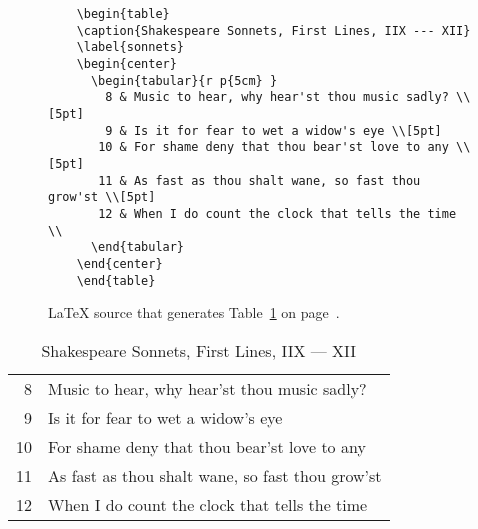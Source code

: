 \begin{figure}
\begin{verbatim}
    \begin{table}
    \caption{Shakespeare Sonnets, First Lines, IIX --- XII}
    \label{sonnets}
    \begin{center}
      \begin{tabular}{r p{5cm} }
        8 & Music to hear, why hear'st thou music sadly? \\[5pt]
        9 & Is it for fear to wet a widow's eye \\[5pt]
       10 & For shame deny that thou bear'st love to any \\[5pt]  
       11 & As fast as thou shalt wane, so fast thou grow'st \\[5pt]
       12 & When I do count the clock that tells the time \\
      \end{tabular}
    \end{center}
    \end{table}
\end{verbatim}
\caption{\LaTeX{} source that generates Table~\ref{sonnets} on 
page~\pageref{sonnets}.}
\label{sonnet-text}
\end{figure}

\begin{table}
\caption{Shakespeare Sonnets, First Lines, IIX --- XII}
\label{sonnets}
\begin{center}
\begin{tabular}{r p{5cm} }
  8 & Music to hear, why hear'st thou music sadly? \\[5pt]
  9 & Is it for fear to wet a widow's eye \\[5pt]
 10 & For shame deny that thou bear'st love to any \\[5pt]  
 11 & As fast as thou shalt wane, so fast thou grow'st \\[5pt]
 12 & When I do count the clock that tells the time \\
\end{tabular}
\end{center}
\end{table}
